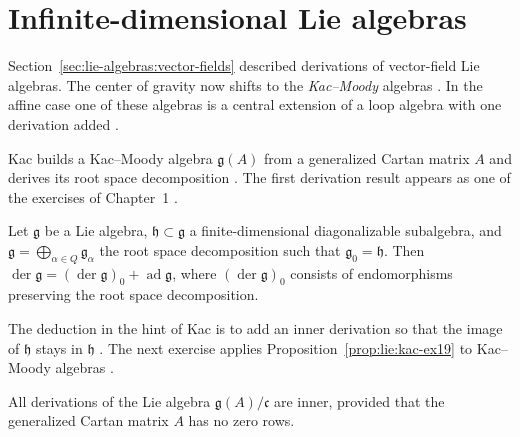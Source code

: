 \section{Infinite-dimensional Lie algebras}\label{sec:lie-algebras:infinite-dimensional}

Section~\ref{sec:lie-algebras:vector-fields} described derivations of
vector-field Lie algebras.  The center of gravity now shifts to the
\emph{Kac--Moody} algebras \cite[pp.~1--2]{Kac1983}.  In the affine
case one of these algebras is a central extension of a loop algebra
with one derivation added \cite[pp.~74--75]{Kac1983}.

Kac builds a Kac--Moody algebra $\mathfrak{g}(A)$ from a generalized
Cartan matrix $A$ and derives its root space decomposition
\cite[pp.~1--11]{Kac1983}.  The first derivation result appears as one
of the exercises of Chapter~1 \cite[Exercise~1.9, p.~11]{Kac1983}.

\begin{proposition}\label{prop:lie:kac-ex19}
Let $\mathfrak{g}$ be a Lie algebra, $\mathfrak{h}\subset\mathfrak{g}$ a
finite-dimensional diagonalizable subalgebra, and
$\mathfrak{g}=\bigoplus_{\alpha\in Q}\mathfrak{g}_{\alpha}$ the root space
decomposition such that $\mathfrak{g}_{0}=\mathfrak{h}$.  Then
$\operatorname{der}\mathfrak{g}=(\operatorname{der}\mathfrak{g})_{0}+\operatorname{ad}\mathfrak{g}$,
where $(\operatorname{der}\mathfrak{g})_{0}$ consists of endomorphisms
preserving the root space decomposition.
\end{proposition}

The deduction in the hint of Kac is to add an inner derivation so that the
image of $\mathfrak{h}$ stays in $\mathfrak{h}$ \cite[p.~11]{Kac1983}.
The next exercise applies Proposition~\ref{prop:lie:kac-ex19} to
Kac--Moody algebras \cite[Exercise~1.10, p.~11]{Kac1983}.

\begin{proposition}\label{prop:lie:kac-ex110}
All derivations of the Lie algebra $\mathfrak{g}(A)/\mathfrak{c}$ are
inner, provided that the generalized Cartan matrix $A$ has no zero rows.
\end{proposition}

